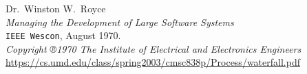 \documentclass{beamer}
\begin{document}
\begin{frame}[fragile]
\begin{thebibliography}{9}
  \footnotesize
  Dr.\ Winston W.\ Royce \\
  \emph{Managing the Development of Large Software Systems} \\
  \texttt{IEEE Wescon},
  August 1970. \\
  \textit{Copyright ®1970 The Institute of Electrical and Electronics Engineers} \\
  {\scriptsize\url{https://cs.umd.edu/class/spring2003/cmsc838p/Process/waterfall.pdf}}
\end{thebibliography}
\end{frame}
\end{document}
